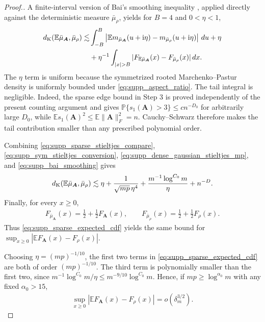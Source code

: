 \documentclass[numsec,webpdf,modern,large,namedate]{oup-authoring-template}
\theoremstyle{plain}
\theoremstyle{remark}
\newif\ifmarkchanges
\newenvironment{revision}{\begingroup\ifmarkchanges\color{red}\fi}{\endgroup}
\begin{document}
\begin{revision}
\begin{proof}[Proof.]
A finite-interval version of Bai's smoothing inequality
\citep[Chapter 8]{bai2010spectral}, applied directly against the
deterministic measure $\bar\mu_\rho$, yields for $B=4$ and $0<\eta<1$,
\begin{align}
\label{eq:supp_bai_smoothing}
    d_{\rm K}(\mathbb E\bar\mu_{\bm A},\bar\mu_\rho)
    \lesssim&
    \int_{-B}^{B}
       \left|
       \mathbb E m_{\bar\mu_{\bm A}}(u+\mathrm i\eta)
       -m_{\bar\mu_\rho}(u+\mathrm i\eta)
       \right|\,du
       +\eta \notag\\
    &+\eta^{-1}\int_{|x|>B}
       |F_{\mathbb E\bar\mu_{\bm A}}(x)
       -F_{\bar\mu_\rho}(x)|\,dx .
\end{align}
The $\eta$ term is uniform because the symmetrized rooted
Marchenko--Pastur density is uniformly bounded under
\eqref{eq:supp_aspect_ratio}.  The tail integral is negligible.  Indeed, the
sparse edge bound in Step 3 is proved independently of the present counting
argument and gives $\mathbb P\{s_1(\bm A)>3\}\le cn^{-D_0}$ for
arbitrarily large $D_0$, while
$\mathbb E s_1(\bm A)^2\le\mathbb E\|\bm A\|_F^2=n$.
Cauchy--Schwarz therefore makes the tail contribution smaller than any
prescribed polynomial order.

Combining \eqref{eq:supp_sparse_stieltjes_compare},
\eqref{eq:supp_sym_stieltjes_conversion},
\eqref{eq:supp_dense_gaussian_stieltjes_mp}, and
\eqref{eq:supp_bai_smoothing} gives
\begin{align}
\label{eq:supp_sparse_expected_cdf}
    d_{\rm K}(\mathbb E\bar\mu_{\bm A},\bar\mu_\rho)
    \lesssim
    \eta+\frac{1}{\sqrt{mp}\,\eta^4}
    +\frac{m^{-1}\log^{C_0}m}{\eta}+n^{-D}.
\end{align}
Finally, for every $x\ge0$,
\begin{align*}
    F_{\bar\mu_{\bm A}}(x)
    =\frac12+\frac12F_{\bm A}(x),
    \qquad
    F_{\bar\mu_\rho}(x)
    =\frac12+\frac12F_\rho(x).
\end{align*}
Thus \eqref{eq:supp_sparse_expected_cdf} yields the same bound for
$\sup_{x\ge0}|\mathbb E F_{\bm A}(x)-F_\rho(x)|$.

Choosing $\eta=(mp)^{-1/10}$, the first two terms in \eqref{eq:supp_sparse_expected_cdf} are both of
order $(mp)^{-1/10}$.  The third term is polynomially smaller than the first two, since
$m^{-1}\log^{C_0}m/\eta\le m^{-9/10}\log^{C_0}m$.  Hence, if $mp\ge\log^{\alpha_0}m$ with any
fixed $\alpha_0>15$,
\begin{align}
\label{eq:supp_sparse_cdf_small}
    \sup_{x\ge0}
    |\mathbb E F_{\bm A}(x)-F_\rho(x)|
    =o(\delta_m^{3/2}).
\end{align}


\end{proof}
\end{revision}
\end{document}
